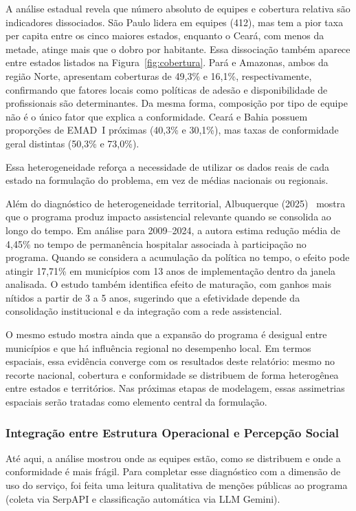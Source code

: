 \documentclass[12pt]{article}
\DeclareRobustCommand{\citelink}[2]{#2~\cite{#1}}
\begin{document}
A análise estadual revela que número absoluto de equipes e cobertura relativa são indicadores dissociados. São Paulo lidera em equipes (412), mas tem a pior taxa per capita entre os cinco maiores estados, enquanto o Ceará, com menos da metade, atinge mais que o dobro por habitante. Essa dissociação também aparece entre estados listados na Figura~\ref{fig:cobertura}. Pará e Amazonas, ambos da região Norte, apresentam coberturas de 49,3\% e 16,1\%, respectivamente, confirmando que fatores locais como políticas de adesão e disponibilidade de profissionais são determinantes. Da mesma forma, composição por tipo de equipe não é o único fator que explica a conformidade. Ceará e Bahia possuem proporções de EMAD~I próximas (40,3\% e 30,1\%), mas taxas de conformidade geral distintas (50,3\% e 73,0\%).

Essa heterogeneidade reforça a necessidade de utilizar os dados reais de cada estado na formulação do problema, em vez de médias nacionais ou regionais.

Além do diagnóstico de heterogeneidade territorial, \citelink{albuquerque2025}{Albuquerque (2025)} mostra que o programa produz impacto assistencial relevante quando se consolida ao longo do tempo. Em análise para 2009--2024, a autora estima redução média de 4,45\% no tempo de permanência hospitalar associada à participação no programa. Quando se considera a acumulação da política no tempo, o efeito pode atingir 17,71\% em municípios com 13 anos de implementação dentro da janela analisada. O estudo também identifica efeito de maturação, com ganhos mais nítidos a partir de 3 a 5 anos, sugerindo que a efetividade depende da consolidação institucional e da integração com a rede assistencial.

O mesmo estudo mostra ainda que a expansão do programa é desigual entre municípios e que há influência regional no desempenho local. Em termos espaciais, essa evidência converge com os resultados deste relatório: mesmo no recorte nacional, cobertura e conformidade se distribuem de forma heterogênea entre estados e territórios. Nas próximas etapas de modelagem, essas assimetrias espaciais serão tratadas como elemento central da formulação.

\iffalse
\subsubsection{Integração entre Estrutura Operacional e Percepção Social}

Até aqui, a análise mostrou onde as equipes estão, como se distribuem e onde a conformidade é mais frágil. Para completar esse diagnóstico com a dimensão de uso do serviço, foi feita uma leitura qualitativa de menções públicas ao programa (coleta via SerpAPI e classificação automática via LLM Gemini).
\end{document}
